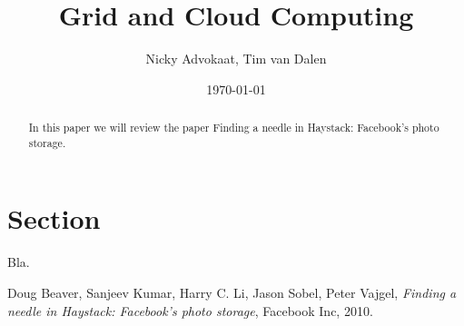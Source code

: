 \documentclass[a4paper]{article}
\title{Grid and Cloud Computing \\ \paper}
\author{Nicky Advokaat, Tim van Dalen}
\date{\today}
\newcommand{\paper}{Finding a needle in Haystack: Facebook's photo storage}
\begin{document}
\maketitle

\begin{abstract}
In this paper we will review the paper \paper \cite{thepaper}.  
\end{abstract}

\section{Section}
Bla.

\begin{thebibliography}{9}

  Doug Beaver, Sanjeev Kumar, Harry C. Li, Jason Sobel, Peter Vajgel,
  \emph{\paper},
  Facebook Inc, 2010.

 
\end{thebibliography}
\end{document}
